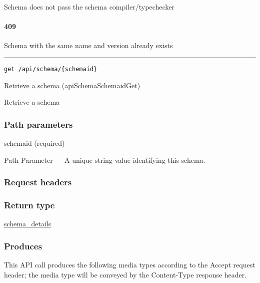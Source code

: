 Schema does not pass the schema compiler/typechecker
\protect\hyperlink{}{}

\hypertarget{section-255}{%
\paragraph{409}\label{section-255}}

Schema with the same name and version already exists
\protect\hyperlink{}{}

\begin{center}\rule{0.5\linewidth}{\linethickness}\end{center}

\protect\hypertarget{apiSchemaSchemaidGet}{}{}

\begin{verbatim}
get /api/schema/{schemaid}
\end{verbatim}

Retrieve a schema ({apiSchemaSchemaidGet})

Retrieve a schema

\hypertarget{path-parameters-37}{%
\subsubsection{Path parameters}\label{path-parameters-37}}

schemaid (required)

{Path Parameter} --- A unique string value identifying this schema.

\hypertarget{request-headers-45}{%
\subsubsection{Request headers}\label{request-headers-45}}

\hypertarget{return-type-63}{%
\subsubsection{Return type}\label{return-type-63}}

\protect\hyperlink{schema_details}{schema\_details}

\hypertarget{produces-77}{%
\subsubsection{Produces}\label{produces-77}}

This API call produces the following media types according to the
{Accept} request header; the media type will be conveyed by the
{Content-Type} response header.

